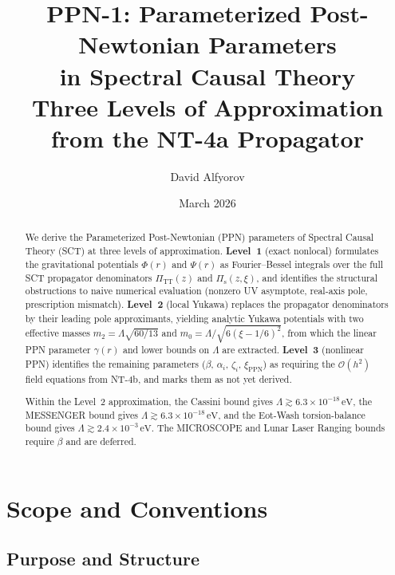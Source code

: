\documentclass[11pt,a4paper]{article}
\title{%
  \textbf{PPN-1: Parameterized Post-Newtonian Parameters}\\[4pt]
  \textbf{in Spectral Causal Theory}\\[6pt]
  \large Three Levels of Approximation from the NT-4a Propagator
}
\author{David Alfyorov}
\date{March 2026}
\newcommand{\PiTT}{\Pi_{\mathrm{TT}}}
\newcommand{\Pis}{\Pi_{\mathrm{s}}}
\newcommand{\order}{\mathcal{O}}
\begin{document}
\maketitle

\begin{center}
\end{center}

\begin{abstract}
We derive the Parameterized Post-Newtonian (PPN) parameters of Spectral
Causal Theory (SCT) at three levels of approximation.
\textbf{Level~1} (exact nonlocal) formulates the gravitational potentials
$\Phi(r)$ and $\Psi(r)$ as Fourier--Bessel integrals over the full SCT
propagator denominators $\PiTT(z)$ and $\Pis(z,\xi)$, and identifies the
structural obstructions to naive numerical evaluation (nonzero UV asymptote,
real-axis pole, prescription mismatch).
\textbf{Level~2} (local Yukawa) replaces the propagator denominators by
their leading pole approximants, yielding analytic Yukawa potentials with
two effective masses $m_2 = \Lambda\sqrt{60/13}$ and
$m_0 = \Lambda/\!\sqrt{6(\xi-1/6)^2}$, from which the linear PPN parameter
$\gamma(r)$ and lower bounds on $\Lambda$ are extracted.
\textbf{Level~3} (nonlinear PPN) identifies the remaining parameters
($\beta$, $\alpha_i$, $\zeta_i$, $\xi_\mathrm{PPN}$) as requiring the
$\order(h^2)$ field equations from NT-4b, and marks them as not yet derived.

Within the Level~2 approximation, the Cassini bound gives
$\Lambda \gtrsim 6.3 \times 10^{-18}\,\mathrm{eV}$, the MESSENGER bound
gives $\Lambda \gtrsim 6.3 \times 10^{-18}\,\mathrm{eV}$, and the
Eot-Wash torsion-balance bound gives
$\Lambda \gtrsim 2.4 \times 10^{-3}\,\mathrm{eV}$.  The MICROSCOPE and
Lunar Laser Ranging bounds require $\beta$ and are deferred.
\end{abstract}

\tableofcontents
\newpage


\section{Scope and Conventions}
\label{sec:scope}

\subsection{Purpose and Structure}
\end{document}
